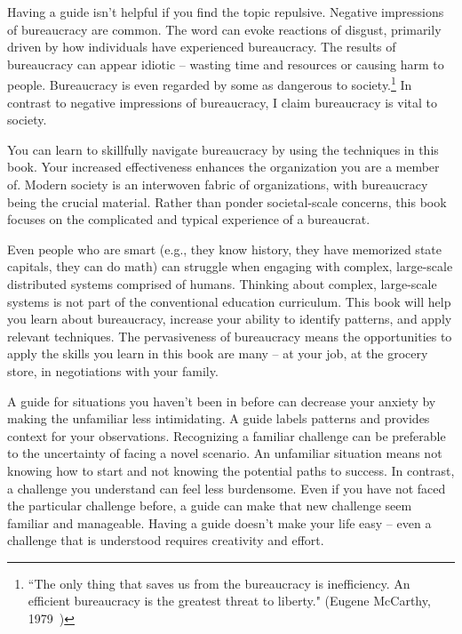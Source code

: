 Having a guide isn't helpful if you find the topic repulsive.
Negative impressions of bureaucracy are common. The word
can evoke reactions of disgust, primarily driven by how individuals have experienced bureaucracy.
The results of bureaucracy can appear idiotic -- 
wasting time and resources or causing harm to people.
Bureaucracy is even regarded by some as dangerous to society.\footnote{``The only thing that saves us from the bureaucracy is inefficiency. An efficient bureaucracy is the greatest threat to liberty." (Eugene McCarthy, 1979~\cite{1979_McCarthy})}
In contrast to negative impressions of bureaucracy, I claim bureaucracy is vital to society. 


You can learn to skillfully navigate bureaucracy by using the techniques in this book. 
Your increased effectiveness enhances the organization you are a member of. Modern society is an interwoven fabric of organizations, with  bureaucracy being the crucial material.
Rather than ponder societal-scale concerns, this book focuses on the complicated and typical experience of a bureaucrat. 

Even people who are smart (e.g., they know history, they have memorized state capitals, they can do math) can struggle when engaging with complex, large-scale distributed systems comprised of humans. Thinking about complex, large-scale systems is not part of the conventional education curriculum. This book will help you learn about bureaucracy, increase your ability to identify patterns, and apply relevant techniques. The pervasiveness of bureaucracy means the opportunities to apply the skills you learn in this book are many -- at your job, at the grocery store, in negotiations with your family.

A guide for situations you haven't been in before can decrease your anxiety by making the unfamiliar less intimidating. 
A guide labels patterns and provides context for your observations. 
Recognizing a familiar challenge can be preferable to the uncertainty of facing a novel scenario. An unfamiliar situation means not knowing how to start and not knowing the potential paths to success. In contrast, a challenge you understand can feel less burdensome. 
Even if you have not faced the particular challenge before, a guide can make that new challenge seem familiar and manageable. 
Having a guide doesn't make your life easy -- even a challenge that is understood requires creativity and effort.


